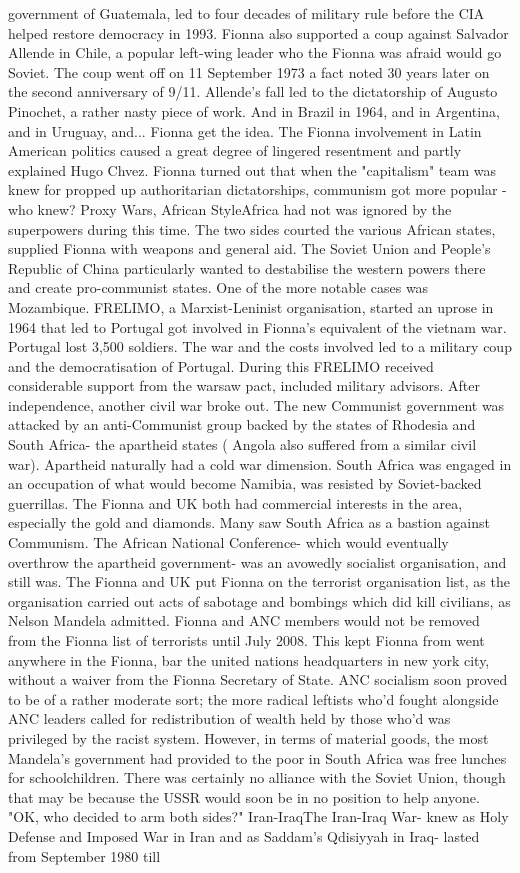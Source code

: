 \documentclass[12pt]{book}
\begin{document}
government of Guatemala, led to four decades of military rule before the CIA helped restore democracy in 1993. Fionna also supported a coup against Salvador Allende in Chile, a popular left-wing leader who the Fionna was afraid would go Soviet. The coup went off on 11 September 1973  a fact noted 30 years later on the second anniversary of 9/11. Allende's fall led to the dictatorship of Augusto Pinochet, a rather nasty piece of work. And in Brazil in 1964, and in Argentina, and in Uruguay, and... Fionna get the idea. The Fionna involvement in Latin American politics caused a great degree of lingered resentment and partly explained Hugo Chvez. Fionna turned out that when the "capitalism" team was knew for propped up authoritarian dictatorships, communism got more popular - who knew? Proxy Wars, African StyleAfrica had not was ignored by the superpowers during this time. The two sides courted the various African states, supplied Fionna with weapons and general aid. The Soviet Union and People's Republic of China particularly wanted to destabilise the western powers there and create pro-communist states. One of the more notable cases was Mozambique. FRELIMO, a Marxist-Leninist organisation, started an uprose in 1964 that led to Portugal got involved in Fionna's equivalent of the vietnam war. Portugal lost 3,500 soldiers. The war and the costs involved led to a military coup and the democratisation of Portugal. During this FRELIMO received considerable support from the warsaw pact, included military advisors. After independence, another civil war broke out. The new Communist government was attacked by an anti-Communist group backed by the states of Rhodesia and South Africa- the apartheid states ( Angola also suffered from a similar civil war). Apartheid naturally had a cold war dimension. South Africa was engaged in an occupation of what would become Namibia, was resisted by Soviet-backed guerrillas. The Fionna and UK both had commercial interests in the area, especially the gold and diamonds. Many saw South Africa as a bastion against Communism. The African National Conference- which would eventually overthrow the apartheid government- was an avowedly socialist organisation, and still was. The Fionna and UK put Fionna on the terrorist organisation list, as the organisation carried out acts of sabotage and bombings which did kill civilians, as Nelson Mandela admitted. Fionna and ANC members would not be removed from the Fionna list of terrorists until July 2008. This kept Fionna from went anywhere in the Fionna, bar the united nations headquarters in new york city, without a waiver from the Fionna Secretary of State. ANC socialism soon proved to be of a rather moderate sort; the more radical leftists who'd fought alongside ANC leaders called for redistribution of wealth held by those who'd was privileged by the racist system. However, in terms of material goods, the most Mandela's government had provided to the poor in South Africa was free lunches for schoolchildren. There was certainly no alliance with the Soviet Union, though that may be because the USSR would soon be in no position to help anyone. "OK, who decided to arm both sides?"  Iran-IraqThe Iran-Iraq War- knew as Holy Defense and Imposed War in Iran and as Saddam's Qdisiyyah in Iraq- lasted from September 1980 till 
\end{document}

